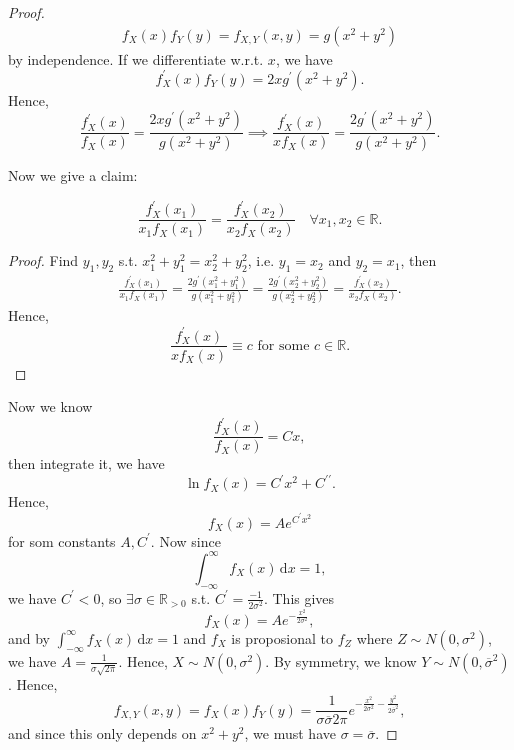 \begin{proof}
    \begin{align*}
        f_X(x) f_Y(y) = f_{X, Y}(x, y) = g(x^2 + y^2)
    \end{align*}
    by independence. If we differentiate w.r.t. \(x\), we have 
    \[
        f_X^{\prime} (x) f_Y(y) = 2x g^{\prime} (x^2 + y^2).
    \] 
    Hence,
    \[
        \frac{f_X^{\prime} (x)}{f_X (x)} = \frac{2x g^{\prime} (x^2 + y^2)}{g(x^2 + y^2)} \implies \frac{f^{\prime}_X(x)}{x f_X(x)} = \frac{2 g^{\prime} (x^2 + y^2)}{g(x^2 + y^2)}.
    \]

     Now we give a claim: 
     \begin{claim}
    \[
        \frac{f_X^{\prime} (x_1)}{x_1 f_X(x_1)} = \frac{f_X^{\prime} (x_2)}{x_2 f_X(x_2)} \quad \forall x_1, x_2 \in \mathbb{R}.
    \]
    \end{claim}
    \begin{proof}
        Find \(y_1, y_2\) s.t. \(x_1^2 + y_1^2 = x^2_2 + y_2^2\), i.e. \(y_1 = x_2\) and \(y_2 = x_1\), then 
        \begin{align*}
            \frac{f_X^{\prime} (x_1)}{x_1 f_X(x_1)} = \frac{2 g^{\prime} (x_1^2 + y_1^2)}{g(x_1^2 + y_1^2)} = \frac{2 g^{\prime} (x_2^2 + y_2^2)}{g(x_2^2 + y_2^2)} = \frac{f_X^{\prime} (x_2)}{x_2 f_X(x_2)}.
        \end{align*}   
        Hence,
        \[
            \frac{f_X^{\prime} (x)}{x f_X(x)} \equiv c \text{ for some } c \in \mathbb{R}. 
        \] 
    \end{proof}
    Now we know 
    \[
        \frac{f_X^{\prime} (x)}{f_X(x)} = Cx,
    \]
    then integrate it, we have 
    \[
        \ln f_X(x) = C^{\prime} x^2 + C^{\prime\prime}.
    \]
    Hence,
    \[
        f_X(x) = A e^{C^{\prime} x^2}
    \]
    for som constants \(A, C^{\prime}\). Now since 
    \[
        \int _{-\infty }^{\infty} f_X(x) \, \mathrm{d} x = 1, 
    \]
    we have \(C^{\prime} < 0\), so \(\exists \sigma \in \mathbb{R} _{> 0}\) s.t. \(C^{\prime} = \frac{-1}{2 \sigma ^2}\). This gives
    \[
        f_X(x) = A e^{- \frac{x^2}{2 \sigma ^2}},
    \]    
    and by \(\int _{-\infty }^{\infty} f_X(x) \, \mathrm{d} x  = 1\) and \(f_X\) is proposional to \(f_Z\) where \(Z \sim N(0, \sigma ^2)\), we have \(A = \frac{1}{\sigma \sqrt{2 \pi} }\). Hence, \(X \sim N(0, \sigma ^2)\). By symmetry, we know \(Y \sim N(0, \overline{\sigma} ^2)\). Hence, 
    \[
        f_{X, Y}(x, y) = f_X(x) f_Y(y) = \frac{1}{\sigma \overline{\sigma} 2 \pi} e^{- \frac{x^2}{2 \sigma ^2} - \frac{y^2}{2 \overline{\sigma}^2}},
    \]    
    and since this only depends on \(x^2 + y^2\), we must have \(\sigma = \overline{\sigma}\).  

\end{proof}
